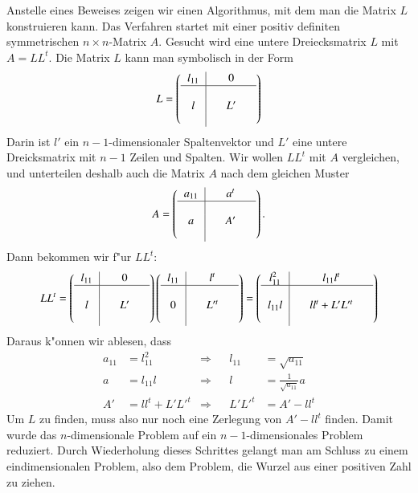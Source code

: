 Anstelle eines Beweises zeigen wir einen Algorithmus, mit dem man die Matrix
$L$ konstruieren kann. Das Verfahren startet mit einer positiv definiten
symmetrischen $n\times n$-Matrix $A$. Gesucht wird eine untere Dreiecksmatrix $L$
mit $A=LL^t$.
Die Matrix $L$ kann man symbolisch in der Form 
\[
L=\left(
\begin{tabular}{>{$}c<{$}|>{$}c<{$}>{$}c<{$}>{$}c<{$}}
l_{11}&&0&\\
\hline
&&&\\
l&&L'&\\
&&&
\end{tabular}
\right)
\]
Darin ist $l'$ ein $n-1$-dimensionaler Spaltenvektor und $L'$ eine
untere Dreicksmatrix mit $n-1$ Zeilen und Spalten.
Wir wollen $LL^t$ mit $A$ vergleichen, und unterteilen deshalb auch die
Matrix $A$ nach dem gleichen Muster
\[
A=\left(
\begin{tabular}{>{$}c<{$}|>{$}c<{$}>{$}c<{$}>{$}c<{$}}
a_{11}&&a^t&\\
\hline
&&&\\
a&&A'&\\
&&&
\end{tabular}
\right).
\]
Dann bekommen wir f"ur $LL^t$:
\[
LL^t=
\left(
\begin{tabular}{>{$}c<{$}|>{$}c<{$}>{$}c<{$}>{$}c<{$}}
l_{11}&&0&\\
\hline
&&&\\
l&&L'&\\
&&&
\end{tabular}
\right)
\left(
\begin{tabular}{>{$}c<{$}|>{$}c<{$}>{$}c<{$}>{$}c<{$}}
l_{11}&&l^t&\\
\hline
&&&\\
0&&L'^t&\\
&&&
\end{tabular}
\right)
=
\left(
\begin{tabular}{>{$}c<{$}|>{$}c<{$}>{$}c<{$}>{$}c<{$}}
l_{11}^2&&l_{11}l^t&\\
\hline
&&&\\
l_{11}l&&ll^t+L'L'^t&\\
&&&
\end{tabular}
\right)
\]
Daraus k"onnen wir ablesen, dass 
\begin{align*}
a_{11}&=l_{11}^2   &\Rightarrow&&l_{11}&=\sqrt{a_{11}}\\
     a&=l_{11}l    &\Rightarrow&&     l&=\frac1{\sqrt{a_{11}}}a\\
    A'&=ll^t+L'L'^t&\Rightarrow&&L'L'^t&=A'-ll^t
\end{align*}
Um $L$ zu finden, muss also nur noch eine Zerlegung von $A'-ll^t$
finden. Damit wurde das $n$-dimensionale Problem auf ein $n-1$-dimensionales
Problem reduziert. Durch Wiederholung dieses Schrittes gelangt man am Schluss
zu einem eindimensionalen Problem, also dem Problem, die Wurzel aus einer
positiven Zahl zu ziehen.


